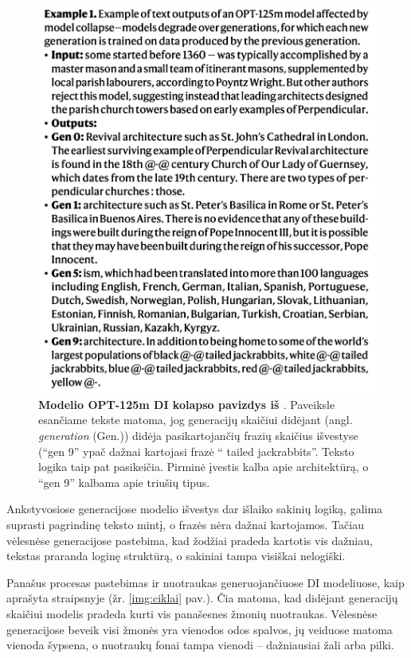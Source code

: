 \documentclass{VUMIFInfKursinis}
\begin{document}
\begin{figure}[H]
    \centering
    \includegraphics[scale=0.5]{img/natureTextCollapse.png}
    \caption{\textbf{Modelio OPT-125m DI kolapso pavizdys iš \cite{AICollapseNature}}. Paveiksle esančiame tekste matoma, jog generacijų skaičiui didėjant (angl. \textsl{generation} (Gen.)) didėja pasikartojančių frazių skaičius išvestyse (\enquote{gen 9} ypač dažnai kartojasi frazė \enquote{ tailed jackrabbits}. Teksto logika taip pat pasikeičia. Pirminė įvestis kalba apie architektūrą, o \enquote{gen 9} kalbama apie triušių tipus.}  
    \label{img:textCollapse}
\end{figure}


Ankstyvosiose generacijose modelio išvestys dar išlaiko sakinių logiką, galima suprasti pagrindinę teksto mintį, o frazės nėra dažnai kartojamos. Tačiau vėlesnėse generacijose pastebima, kad žodžiai pradeda kartotis vis dažniau, tekstas praranda loginę struktūrą, o sakiniai tampa visiškai nelogiški.

Panašus procesas pastebimas ir nuotraukas generuojančiuose DI modeliuose, kaip aprašyta straipsnyje \cite{ModelsGoMAD} (žr. \ref{img:ciklai} pav.). Čia matoma, kad didėjant generacijų skaičiui modelis pradeda kurti vis panašesnes žmonių nuotraukas. Vėlesnėse generacijose beveik visi žmonės yra vienodos odos spalvos, jų veiduose matoma vienoda šypsena, o nuotraukų fonai tampa vienodi – dažniausiai žali arba pilki. 
\end{document}
